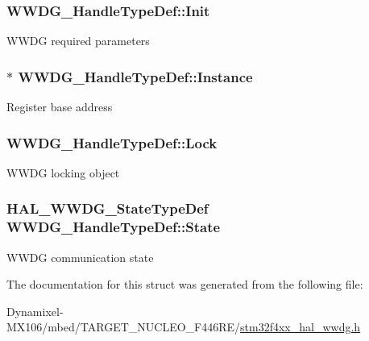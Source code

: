 \subsubsection[{\texorpdfstring{Init}{Init}}]{ W\+W\+D\+G\+\_\+\+Handle\+Type\+Def\+::\+Init}\hypertarget{struct_w_w_d_g___handle_type_def_ae8ce42374ba68e31fae2499fe05a3dc9}{}\label{struct_w_w_d_g___handle_type_def_ae8ce42374ba68e31fae2499fe05a3dc9}
W\+W\+DG required parameters 
\subsubsection[{\texorpdfstring{Instance}{Instance}}]{$\ast$ W\+W\+D\+G\+\_\+\+Handle\+Type\+Def\+::\+Instance}\hypertarget{struct_w_w_d_g___handle_type_def_af40eb4f45fcac91d6100bbd3c753813d}{}\label{struct_w_w_d_g___handle_type_def_af40eb4f45fcac91d6100bbd3c753813d}
Register base address 
\subsubsection[{\texorpdfstring{Lock}{Lock}}]{ W\+W\+D\+G\+\_\+\+Handle\+Type\+Def\+::\+Lock}\hypertarget{struct_w_w_d_g___handle_type_def_ab5a66448d9ddd25c3bc3789e2504b164}{}\label{struct_w_w_d_g___handle_type_def_ab5a66448d9ddd25c3bc3789e2504b164}
W\+W\+DG locking object 
\subsubsection[{\texorpdfstring{State}{State}}]{ {\bf H\+A\+L\+\_\+\+W\+W\+D\+G\+\_\+\+State\+Type\+Def} W\+W\+D\+G\+\_\+\+Handle\+Type\+Def\+::\+State}\hypertarget{struct_w_w_d_g___handle_type_def_a6c82baebf81039060c7064ec6aad1b91}{}\label{struct_w_w_d_g___handle_type_def_a6c82baebf81039060c7064ec6aad1b91}
W\+W\+DG communication state 

The documentation for this struct was generated from the following file\+:\begin{DoxyCompactItemize}
\item 
Dynamixel-\/\+M\+X106/mbed/\+T\+A\+R\+G\+E\+T\+\_\+\+N\+U\+C\+L\+E\+O\+\_\+\+F446\+R\+E/\hyperlink{stm32f4xx__hal__wwdg_8h}{stm32f4xx\+\_\+hal\+\_\+wwdg.\+h}\end{DoxyCompactItemize}
